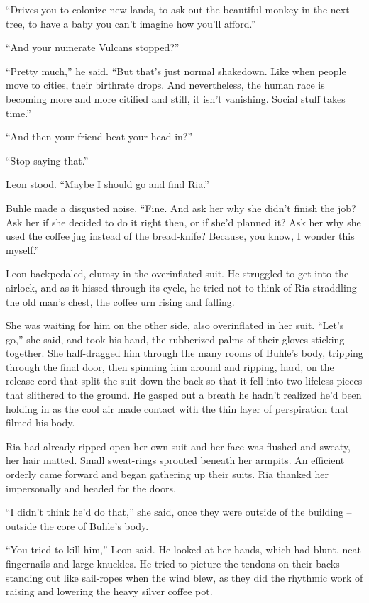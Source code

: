 “Drives you to colonize new lands, to ask out the beautiful monkey in 
the next tree, to have a baby you can't imagine how you'll afford.”

“And your numerate Vulcans stopped?”

“Pretty much,” he said. “But that's just normal shakedown. Like 
when people move to cities, their birthrate drops. And nevertheless, 
the human race is becoming more and more citified and still, it isn't 
vanishing. Social stuff takes time.”

“And then your friend beat your head in?”

“Stop saying that.”

Leon stood. “Maybe I should go and find Ria.”

Buhle made a disgusted noise. “Fine. And ask her why she didn't 
finish the job? Ask her if she decided to do it right then, or if she'd 
planned it? Ask her why she used the coffee jug instead of the 
bread-knife? Because, you know, I wonder this myself.”

Leon backpedaled, clumsy in the overinflated suit. He struggled to get 
into the airlock, and as it hissed through its cycle, he tried not to 
think of Ria straddling the old man's chest, the coffee urn rising and 
falling.

She was waiting for him on the other side, also overinflated in her 
suit. “Let's go,” she said, and took his hand, the rubberized palms 
of their gloves sticking together. She half-dragged him through the 
many rooms of Buhle's body, tripping through the final door, then 
spinning him around and ripping, hard, on the release cord that split 
the suit down the back so that it fell into two lifeless pieces that 
slithered to the ground. He gasped out a breath he hadn't realized he'd 
been holding in as the cool air made contact with the thin layer of 
perspiration that filmed his body.

Ria had already ripped open her own suit and her face was flushed and 
sweaty, her hair matted. Small sweat-rings sprouted beneath her 
armpits. An efficient orderly came forward and began gathering up their 
suits. Ria thanked her impersonally and headed for the doors.

“I didn't think he'd do that,” she said, once they were outside of 
the building -- outside the core of Buhle's body.

“You tried to kill him,” Leon said. He looked at her hands, which 
had blunt, neat fingernails and large knuckles. He tried to picture the 
tendons on their backs standing out like sail-ropes when the wind blew, 
as they did the rhythmic work of raising and lowering the heavy silver 
coffee pot.

